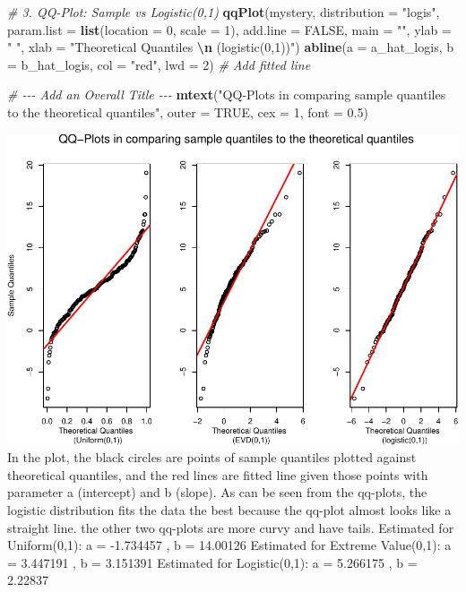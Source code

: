 \documentclass[
]{article}
\newenvironment{Shaded}{\begin{snugshade}}{\end{snugshade}}
\newcommand{\AttributeTok}[1]{\textcolor[rgb]{0.13,0.29,0.53}{#1}}
\newcommand{\CommentTok}[1]{\textcolor[rgb]{0.56,0.35,0.01}{\textit{#1}}}
\newcommand{\ConstantTok}[1]{\textcolor[rgb]{0.56,0.35,0.01}{#1}}
\newcommand{\DecValTok}[1]{\textcolor[rgb]{0.00,0.00,0.81}{#1}}
\newcommand{\FloatTok}[1]{\textcolor[rgb]{0.00,0.00,0.81}{#1}}
\newcommand{\FunctionTok}[1]{\textcolor[rgb]{0.13,0.29,0.53}{\textbf{#1}}}
\newcommand{\NormalTok}[1]{#1}
\newcommand{\SpecialCharTok}[1]{\textcolor[rgb]{0.81,0.36,0.00}{\textbf{#1}}}
\newcommand{\StringTok}[1]{\textcolor[rgb]{0.31,0.60,0.02}{#1}}
\begin{document}
\begin{Shaded}
\begin{Highlighting}[]
\CommentTok{\# 3. QQ{-}Plot: Sample vs Logistic(0,1)}
\FunctionTok{qqPlot}\NormalTok{(mystery, }\AttributeTok{distribution =} \StringTok{"logis"}\NormalTok{,}
       \AttributeTok{param.list =} \FunctionTok{list}\NormalTok{(}\AttributeTok{location =} \DecValTok{0}\NormalTok{, }\AttributeTok{scale =} \DecValTok{1}\NormalTok{),}
       \AttributeTok{add.line =} \ConstantTok{FALSE}\NormalTok{, }\AttributeTok{main =} \StringTok{""}\NormalTok{,}
       \AttributeTok{ylab =} \StringTok{" "}\NormalTok{,}
       \AttributeTok{xlab =} \StringTok{"Theoretical Quantiles }\SpecialCharTok{\textbackslash{}n}\StringTok{ (logistic(0,1))"}\NormalTok{)}
\FunctionTok{abline}\NormalTok{(}\AttributeTok{a =}\NormalTok{ a\_hat\_logis, }\AttributeTok{b =}\NormalTok{ b\_hat\_logis, }\AttributeTok{col =} \StringTok{"red"}\NormalTok{, }\AttributeTok{lwd =} \DecValTok{2}\NormalTok{)  }\CommentTok{\# Add fitted line}

\CommentTok{\# {-}{-}{-} Add an Overall Title {-}{-}{-}}
\FunctionTok{mtext}\NormalTok{(}\StringTok{"QQ{-}Plots in comparing sample quantiles to the theoretical quantiles"}\NormalTok{, }\AttributeTok{outer =} \ConstantTok{TRUE}\NormalTok{, }\AttributeTok{cex =} \DecValTok{1}\NormalTok{, }\AttributeTok{font =} \FloatTok{0.5}\NormalTok{)}
\end{Highlighting}
\end{Shaded}

\includegraphics{SDA_A2_files/figure-latex/unnamed-chunk-2-1.pdf} In the
plot, the black circles are points of sample quantiles plotted against
theoretical quantiles, and the red lines are fitted line given those
points with parameter a (intercept) and b (slope). As can be seen from
the qq-plots, the logistic distribution fits the data the best because
the qq-plot almost looks like a straight line. the other two qq-plots
are more curvy and have tails. Estimated for Uniform(0,1): a = -1.734457
, b = 14.00126 Estimated for Extreme Value(0,1): a = 3.447191 , b =
3.151391 Estimated for Logistic(0,1): a = 5.266175 , b = 2.22837
\end{document}
